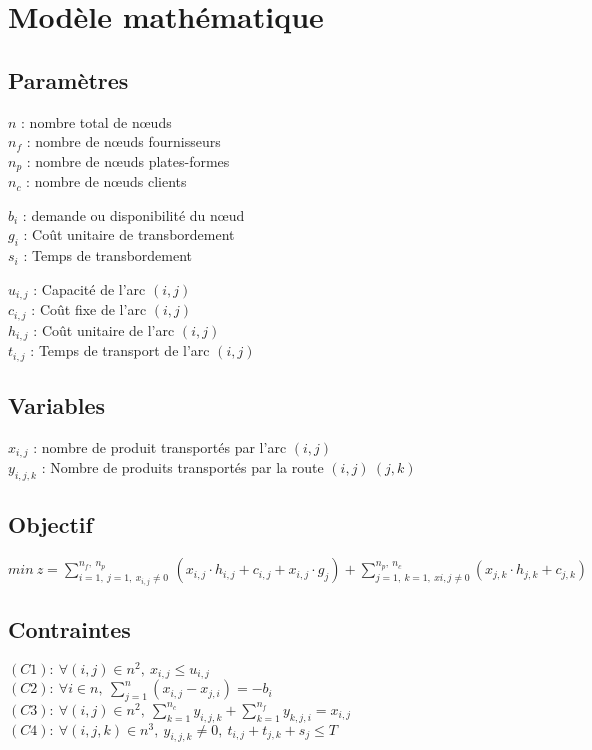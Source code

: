 \documentclass[a4paper, 12pt]{report}
\begin{document}
\chapter{Modèle mathématique}
\section{Paramètres}
$n$ : nombre total de nœuds\\
$n_f$ : nombre de nœuds fournisseurs\\
$n_p$ : nombre de nœuds plates-formes\\
$n_c$ : nombre de nœuds clients \newline

$b_i$ : demande ou disponibilité du nœud\\
$g_i$ : Coût unitaire de transbordement\\
$s_i$ : Temps de transbordement\newline

$u_{i,j}$ : Capacité de l'arc $(i,j)$\\
$c_{i,j}$ : Coût fixe de l'arc $(i,j)$\\
$h_{i,j}$ : Coût unitaire de l'arc $(i,j)$\\
$t_{i,j}$ : Temps de transport de l'arc $(i,j)$

\section{Variables}
$x_{i,j}$ : nombre de produit transportés par l'arc $(i,j)$\\
$y_{i,j,k}$ : Nombre de produits transportés par la route $(i,j)\ (j,k)$\\

\section{Objectif}
$ min\ z = \sum_{i=1,\ j=1,\ x_{i,j}\not=0\ }^{n_f,\ n_p}
	(x_{i,j} \cdot h_{i,j} + c_{i,j} + x_{i,j} \cdot g_j) 
	    + \sum_{j=1,\ k=1,\ x{i,j} \not=0}^{n_p,\ n_c}(x_{j,k} \cdot h_{j,k} + c_{j,k})$

\section{Contraintes}
$ (C1):\ \forall (i,j)\in n^2,\ x_{i,j} \leq u_{i,j} $ \\
$ (C2):\ \forall i\in n, \ \sum_{j=1}^{n}(x_{i,j} - x_{j,i}) = -b_i$\\
$ (C3):\ \forall (i,j)\in n^2,\ \sum_{k=1}^{n_c} y_{i,j,k} + \sum_{k=1}^{n_f} y_{k,j,i} = x_{i,j}$\\
$ (C4):\ \forall (i,j,k)\in n^3,\ y_{i,j,k} \not= 0,\ 
	t_{i,j} + t_{j,k} + s_j \leq T$\\
\end{document}
